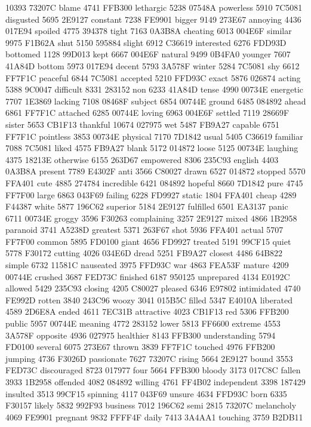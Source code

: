 10393 73207C blame 4741 FFB300 lethargic 5238 07548A powerless 5910
7C5081 disgusted 5695 2E9127 constant 7238 FE9901 bigger 9149 273E67
annoying 4436 017E94 spoiled 4775 394378 tight 7163 0A3B8A cheating
6013 004E6F similar 9975 F1B62A shut 5150 595884 slight 6912 C36619
interested 6276 FDD93D bottomed 1128 99D013 kept 6667 004E6F natural
9499 0B4FA0 younger 7607 41A84D bottom 5973 017E94 decent 5793 3A578F
winter 5284 7C5081 shy 6612 FF7F1C peaceful 6844 7C5081 accepted 5210
FFD93C exact 5876 026874 acting 5388 9C0047 difficult 8331 283152 non
6233 41A84D tense 4990 00734E energetic 7707 1E3869 lacking 7108 08468F
subject 6854 00744E ground 6485 084892 ahead 6861 FF7F1C attached 6285
00744E loving 6963 004E6F settled 7119 28669F sister 5653 CB1F13
thankful 10674 027975 wet 5487 FB9A27 capable 6751 FF7F1C pointless
3853 00734E physical 7170 7D1842 usual 5405 C36619 familiar 7088 7C5081
liked 4575 FB9A27 blank 5172 014872 loose 5125 00734E laughing 4375
18213E otherwise 6155 263D67 empowered 8306 235C93 english 4403 0A3B8A
present 7789 E4302F anti 3566 C80027 drawn 6527 014872 stopped 5570
FFA401 cute 4885 274784 incredible 6421 084892 hopeful 8660 7D1842 pure
4745 FF7F00 large 6863 043F69 failing 6228 FD9927 static 1804 FFA401
cheap 4289 F44387 white 5877 196C62 superior 5184 2E9127 fulfilled 6501
EA3137 panic 6711 00734E groggy 3596 F30263 complaining 3257 2E9127
mixed 4866 1B2958 paranoid 3741 A5238D greatest 5371 263F67 shot 5936
FFA401 actual 5707 FF7F00 common 5895 FD0100 giant 4656 FD9927 treated
5191 99CF15 quiet 5778 F30172 cutting 4026 034E6D dread 5251 FB9A27
closest 4486 64B822 simple 6732 11581C nauseated 3975 FFD93C war 4863
FEA53F mature 4209 00744E crushed 3687 FED73C finished 6187 950125
unprepared 4134 E0192C allowed 5429 235C93 closing 4205 C80027 pleased
6346 E97802 intimidated 4740 FE992D rotten 3840 243C96 woozy 3041
015B5C filled 5347 E4010A liberated 4589 2D6E8A ended 4611 7EC31B
attractive 4023 CB1F13 red 5306 FFB200 public 5957 00744E meaning 4772
283152 lower 5813 FF6600 extreme 4553 3A578F opposite 4936 027975
healthier 8143 FFB300 understanding 5794 FD0100 several 6075 273E67
thrown 3839 FF7F1C touched 4976 FFB200 jumping 4736 F3026D passionate
7627 73207C rising 5664 2E9127 bound 3553 FED73C discouraged 8723
017977 four 5664 FFB300 bloody 3173 017C8C fallen 3933 1B2958 offended
4082 084892 willing 4761 FF4B02 independent 3398 187429 insulted 3513
99CF15 spinning 4117 043F69 unsure 4634 FFD93C born 6335 F30157 likely
5832 992F93 business 7012 196C62 semi 2815 73207C melancholy 4069
FE9901 pregnant 9832 FFFF4F daily 7413 3A4AA1 touching 3759 B2DB11

